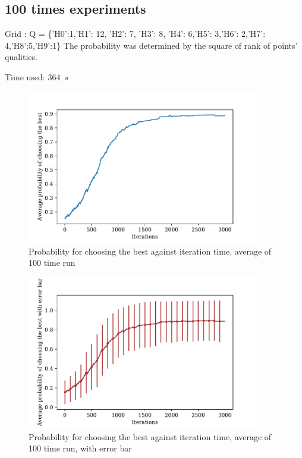\documentclass[a4paper,12pt]{article}
\begin{document}
\subsection{100 times experiments}
	Grid : Q = \{'H0':1,'H1': 12, 'H2': 7, 'H3': 8, 'H4': 6,'H5': 3,'H6': 2,'H7': 4,'H8':5,'H9':1\}
	The probability was determined by the square of rank of points' qualities.
	\graphicspath{{figsNorm1/}}
	Time used: 364~${s}$
	\begin{figure}[H]
		\centering
		\includegraphics[width=0.9\textwidth]{Average_pbestnorm1_200_3000_100}
		\caption{Probability for choosing the best against iteration time, average of 100 time run}\label{Average_pbestnorm1_200_3000_100}
	\end{figure}
	\begin{figure}[H]
		\centering
		\includegraphics[width=0.9\textwidth]{Average_pbest_errbarnorm1_200_3000_100}
		\caption{Probability for choosing the best against iteration time, average of 100 time run, with error bar}\label{Average_pbest_errbarnorm1_200_3000_100}
	\end{figure}
\end{document}
